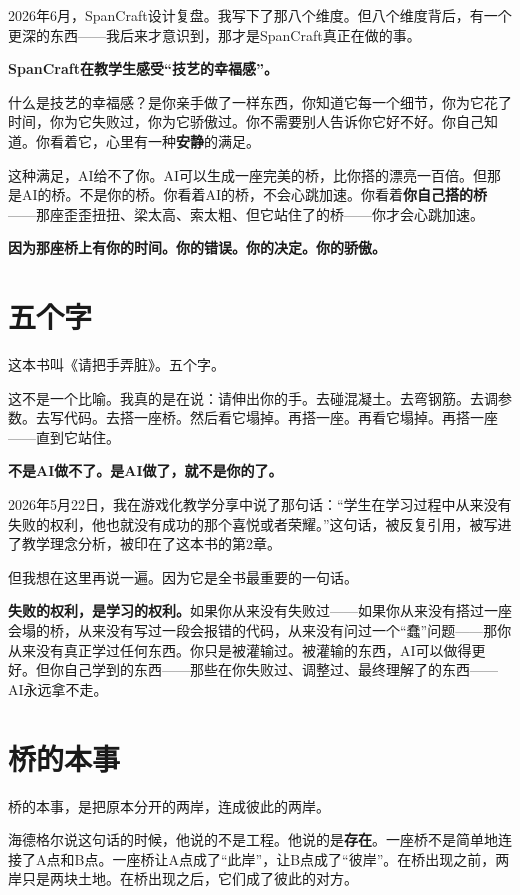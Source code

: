 2026年6月，SpanCraft设计复盘。我写下了那八个维度。但八个维度背后，有一个更深的东西——我后来才意识到，那才是SpanCraft真正在做的事。

\textbf{SpanCraft在教学生感受``技艺的幸福感''。}

什么是技艺的幸福感？是你亲手做了一样东西，你知道它每一个细节，你为它花了时间，你为它失败过，你为它骄傲过。你不需要别人告诉你它好不好。你自己知道。你看着它，心里有一种\textbf{安静}的满足。

这种满足，AI给不了你。AI可以生成一座完美的桥，比你搭的漂亮一百倍。但那是AI的桥。不是你的桥。你看着AI的桥，不会心跳加速。你看着\textbf{你自己搭的桥}——那座歪歪扭扭、梁太高、索太粗、但它站住了的桥——你才会心跳加速。

\textbf{因为那座桥上有你的时间。你的错误。你的决定。你的骄傲。}

\section{五个字}

这本书叫《请把手弄脏》。五个字。

这不是一个比喻。我真的是在说：请伸出你的手。去碰混凝土。去弯钢筋。去调参数。去写代码。去搭一座桥。然后看它塌掉。再搭一座。再看它塌掉。再搭一座——直到它站住。

\textbf{不是AI做不了。是AI做了，就不是你的了。}

2026年5月22日，我在游戏化教学分享中说了那句话：``学生在学习过程中从来没有失败的权利，他也就没有成功的那个喜悦或者荣耀。''这句话，被反复引用，被写进了教学理念分析，被印在了这本书的第2章。

但我想在这里再说一遍。因为它是全书最重要的一句话。

\textbf{失败的权利，是学习的权利。}如果你从来没有失败过——如果你从来没有搭过一座会塌的桥，从来没有写过一段会报错的代码，从来没有问过一个``蠢''问题——那你从来没有真正学过任何东西。你只是被灌输过。被灌输的东西，AI可以做得更好。但你自己学到的东西——那些在你失败过、调整过、最终理解了的东西——AI永远拿不走。

\section{桥的本事}

桥的本事，是把原本分开的两岸，连成彼此的两岸。

海德格尔说这句话的时候，他说的不是工程。他说的是\textbf{存在}。一座桥不是简单地连接了A点和B点。一座桥让A点成了``此岸''，让B点成了``彼岸''。在桥出现之前，两岸只是两块土地。在桥出现之后，它们成了彼此的对方。

